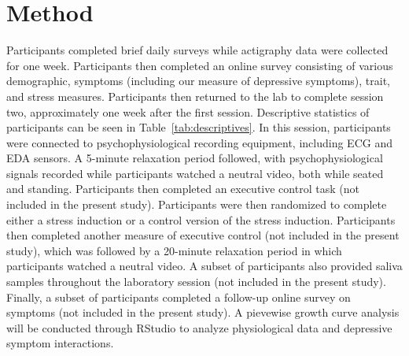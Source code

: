 \documentclass[12pt]{article}
\begin{document}
\section{Method}
 Participants completed brief daily surveys while actigraphy data were collected for one week. Participants then completed an online survey consisting of various demographic, symptoms (including our measure of depressive symptoms), trait, and stress measures. Participants then returned to the lab to complete session two, approximately one week after the first session. Descriptive statistics of participants can be seen in Table~\ref{tab:descriptives}. In this session, participants were connected to psychophysiological recording equipment, including ECG and EDA sensors. A 5-minute relaxation period followed, with psychophysiological signals recorded while participants watched a neutral video, both while seated and standing. Participants then completed an executive control task (not included in the present study). Participants were then randomized to complete either a stress induction or a control version of the stress induction. Participants then completed another measure of executive control (not included in the present study), which was followed by a 20-minute relaxation period in which participants watched a neutral video. A subset of participants also provided saliva samples throughout the laboratory session (not included in the present study). Finally, a subset of participants completed a follow-up online survey on symptoms (not included in the present study). A pievewise growth curve analysis will be conducted through RStudio to analyze physiological data and depressive symptom interactions. 
\end{document}
